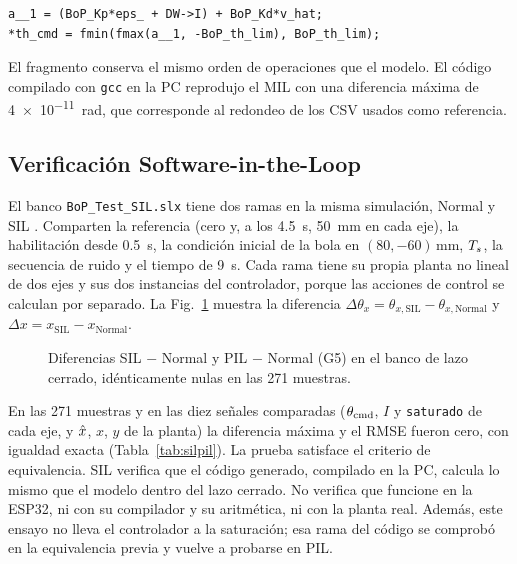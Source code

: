 \begin{lstlisting}
a__1 = (BoP_Kp*eps_ + DW->I) + BoP_Kd*v_hat;
*th_cmd = fmin(fmax(a__1, -BoP_th_lim), BoP_th_lim);
\end{lstlisting}

El fragmento conserva el mismo orden de operaciones que el modelo. El código compilado con
\texttt{gcc} en la PC reprodujo el MIL con una diferencia máxima de \SI{4e-11}{\radian}, que
corresponde al redondeo de los CSV usados como referencia.

\subsection{Verificación Software-in-the-Loop}

El banco \texttt{BoP\_Test\_SIL.slx} tiene dos ramas en la misma simulación, Normal y SIL
\cite{mw_sil}. Comparten la referencia (cero y, a los \SI{4.5}{\second}, \SI{50}{\milli\metre} en
cada eje), la habilitación desde \SI{0.5}{\second}, la condición inicial de la bola en
$(80, -60)\,\si{\milli\metre}$, $T_s$, la secuencia de ruido y el tiempo de \SI{9}{\second}. Cada
rama tiene su propia planta no lineal de dos ejes y sus dos instancias del controlador, porque
las acciones de control se calculan por separado. La Fig.~\ref{fig:sil} muestra la diferencia
$\Delta\theta_x = \theta_{x,\mathrm{SIL}} - \theta_{x,\mathrm{Normal}}$ y
$\Delta x = x_{\mathrm{SIL}} - x_{\mathrm{Normal}}$.

\begin{figure}[!t]
\centering
{}
\caption{Diferencias SIL $-$ Normal y PIL $-$ Normal (G5) en el banco de lazo cerrado,
idénticamente nulas en las \num{271} muestras.}
\label{fig:sil}
\end{figure}

En las \num{271} muestras y en las diez señales comparadas ($\theta_{\mathrm{cmd}}$, $I$ y \texttt{saturado} de
cada eje, y $\hat{x}$, $x$, $y$ de la planta) la diferencia máxima y el RMSE fueron cero, con igualdad
exacta (Tabla~\ref{tab:silpil}). La prueba satisface el criterio de equivalencia. SIL verifica
que el código generado, compilado en la PC, calcula lo mismo que el modelo dentro del lazo
cerrado. No verifica que funcione en la ESP32, ni con su compilador y su aritmética, ni con la
planta real. Además, este ensayo no lleva el controlador a la saturación; esa rama del código se
comprobó en la equivalencia previa y vuelve a probarse en PIL.
